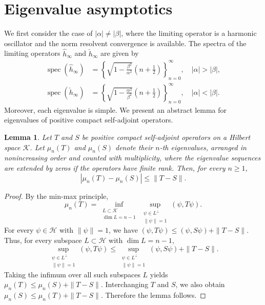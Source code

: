 \documentclass[12pt,dvipdfmx]{article}
\newtheorem{lemma}[theorem]{Lemma}
\begin{document}
\section{Eigenvalue asymptotics}\label{s4}
%
%
We first consider the case of $|\alpha|\ne|\beta|$, where the limiting operator is a harmonic oscillator and the norm resolvent convergence is available. 
    The spectra of the limiting operators $\hat{h}_\infty$ and $\check{h}_\infty $ are given by
\begin{align*}
    \operatorname{spec} \left(\hat{h}_\infty\right)
    &=
    \left\{
        \sqrt{1 - \frac{\beta^2}{\alpha^2}}
        \left(n + \frac12\right)
    \right\}_{n=0}^\infty,
    \quad  |\alpha| > |\beta|,
    \\
    \operatorname{spec} \left(\check{h}_\infty \right)
    &=
    \left\{
        \sqrt{1 - \frac{\alpha^2}{\beta^2}}
        \left(n + \frac12\right)
    \right\}_{n=0}^\infty,
    \quad  |\alpha| < |\beta|.
\end{align*}
Moreover, each eigenvalue is simple.
%
We present an abstract lemma for eigenvalues of positive compact self-adjoint operators. 
\begin{lemma}\label{ev}
Let $T$ and $S$ be positive compact self-adjoint operators on a Hilbert space $\mathcal K$. 
Let $\mu_n(T)$ and $\mu_n(S)$ denote their $n$-th eigenvalues, arranged in nonincreasing order and counted with multiplicity, where the eigenvalue sequences are extended by zeros if the operators have finite rank. Then, for every $n\geq 1$,
\[
    \left|\mu_n(T)-\mu_n(S)\right|
    \leq
    \|T-S\|.
\]
\end{lemma}

\begin{proof}
By the min-max principle,
\[
    \mu_n(T)
    =
    \inf_{\substack{L\subset\mathcal K\\ \dim L=n-1}}
    \sup_{\substack{\psi\in L^\perp\\ \|\psi\|=1}}
    ( \psi,T\psi) .
\]
For every $\psi\in\mathcal H$ with $\|\psi\|=1$, we have
$
    (\psi,T\psi)
    \leq
    (\psi,S\psi)+\|T-S\|$. 
Thus, for every subspace $L\subset\mathcal H$ with $\dim L=n-1$,
\[
    \sup_{\substack{\psi\in L^\perp\\ \|\psi\|=1}}
    (\psi,T\psi)
    \leq
    \sup_{\substack{\psi\in L^\perp\\ \|\psi\|=1}}
    (\psi,S\psi)
    +
    \|T-S\|.
\]
Taking the infimum over all such subspaces $L$ yields
$
    \mu_n(T)
    \leq
    \mu_n(S)+\|T-S\|$. 
Interchanging $T$ and $S$, we also obtain
$
    \mu_n(S)
    \leq
    \mu_n(T)+\|T-S\|$. 
Therefore the lemma follows. 
\end{proof}
\end{document}
